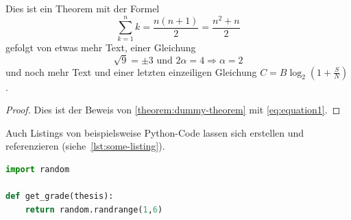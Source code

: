 
\begin{theorem}\label{theorem:dummy-theorem}
Dies ist ein Theorem mit der Formel
\begin{equation}
\label{eq:equation1}
\sum_{k=1}^n k=\frac{n(n+1)}{2}=\frac{n^2+n}{2}
\end{equation}
gefolgt von etwas mehr Text, einer Gleichung
$$\sqrt{9}=\pm3\text{ und }2\alpha=4\Rightarrow\alpha=2$$
und noch mehr Text und einer letzten einzeiligen Gleichung \(C = B \log_2 \left(1 + \frac{S}{N} \right) \).
\end{theorem}

\begin{proof}
Dies ist der Beweis von \cref{theorem:dummy-theorem} mit \cref{eq:equation1}.
\end{proof}


Auch Listings von beispielsweise Python-Code lassen sich erstellen und referenzieren
(siehe~\cref{lst:some-listing}).
\begin{lstlisting}[language=Python, caption=Python Listing, label=lst:some-listing]
import random
    
def get_grade(thesis):
    return random.randrange(1,6)
\end{lstlisting}
